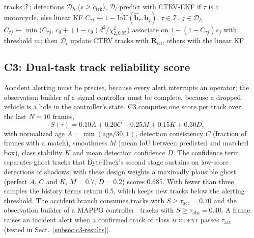 \documentclass[twocolumn]{svjour3}
\begin{document}
\begin{algorithm}[t]
\caption{C2 for one frame}\label{alg:c2}
\footnotesize
\begin{algorithmic}[1]
\Require tracks $\mathcal{T}$; detections $\mathcal{D}_h$ ($s\ge c_{\mathrm{trk}}$), $\mathcal{D}_l$
  \State predict with CTRV-EKF if $\tau$ is a motorcycle, else linear KF
\EndFor
\State $C_{\tau j}\gets1-\mathrm{IoU}(\hat{\mathbf{b}}_\tau,\mathbf{b}_j)$, $\tau\in\mathcal{T}$, $j\in\mathcal{D}_h$
  \State $C_{\tau j}\gets\min\bigl(C_{\tau j},\,c_0+(1-c_0)d^{2}/\chi^{2}_{2,0.95}\bigr)$
\EndFor
\State associate on $1-(1-C_{\tau j})s_j$ with threshold $m$; then $\mathcal{D}_l$
\State update CTRV tracks with $\mathbf{R}_{\mathrm{eff}}$, others with the linear KF
\end{algorithmic}
\end{algorithm}

\subsection{C3: Dual-task track reliability score}\label{sec:c3}

Accident alerting must be precise, because every alert interrupts an operator;
the observation builder of a signal controller must be complete, because a
dropped vehicle is a hole in the controller's state. C3 computes one score per
track over the last $N=10$ frames,
\begin{equation}
S(\tau)=0.10A+0.20C+0.25M+0.15K+0.30D,\label{eq:score}
\end{equation}
with normalized age $A=\min(\mathrm{age}/30,1)$, detection consistency $C$
(fraction of frames with a match), smoothness $M$ (mean IoU between predicted
and matched box), class stability $K$ and mean detection confidence $D$. The
confidence term separates ghost tracks that ByteTrack's second stage sustains on
low-score detections of shadows; with these design weights a maximally plausible
ghost (perfect $A$, $C$ and $K$, $M=0.7$, $D=0.2$) scores 0.685. With fewer than three samples the history terms return 0.5,
which keeps new tracks below the alerting threshold. The accident branch
consumes tracks with $S\ge\tau_{\mathrm{acc}}=0.70$ and the observation builder of
a MAPPO controller~\cite{Yu2022_mappo} tracks with $S\ge\tau_{\mathrm{obs}}=0.40$.
A frame raises an incident alert when a confirmed track of class
\textsc{accident} passes $\tau_{\mathrm{acc}}$ (tested in Sect.~\ref{subsec:c3-results}).
\end{document}
